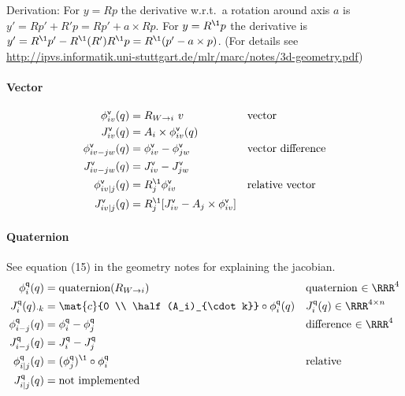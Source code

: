 \documentclass[10pt,fleqn,twoside]{article}
\newcommand{\veC}{{\textsf{v}}}
\newcommand{\quat}{{\textsf{q}}}
\newcommand{\RO}[2]{R_{{#1}\rightarrow{#2}}}
\begin{document}
{{Derivation: For $y=R p$ the derivative w.r.t.\ a rotation around axis
$a$ is $y' = R p' + R' p = R p' + a \times R p$. For $y=R^\1 p$ the
derivative is $y' = R^\1 p' - R^\1 (R') R^\1 p = R^\1 (p' - a \times
p)$.  (For details see
\url{http://ipvs.informatik.uni-stuttgart.de/mlr/marc/notes/3d-geometry.pdf})


\paragraph{Vector}

\begin{align}
\phi^\veC_{iv}(q)
 &= \RO{W}{i}~ v
 && \text{vector} \\
J^\veC_{iv}(q)
 &= A_i\times \phi^\veC_{iv}(q) \\
\phi^\veC_{iv-jw}(q)
 &= \phi^\veC_{iv} - \phi^\veC_{jw}
 && \text{vector difference} \\
J^\veC_{iv-jw}(q)
 &= J^\veC_{iv} - J^\veC_{jw} \\
\phi^\veC_{iv|j}(q)
 &= R_j^\1 \phi^\veC_{iv}
 && \text{relative vector} \\
J^\veC_{iv|j}(q)
 &= R_j^\1 [J^\veC_{iv} - A_j \times \phi^\veC_{iv}]
\end{align}


\paragraph{Quaternion}

See equation (15) in the geometry notes for explaining the jacobian.
\begin{align}
\phi^\quat_{i}(q)
 &= \text{quaternion}(\RO{W}{i})
 && \text{quaternion $\in\RRR^4$} \\
J^\quat_{i}(q)_{\cdot k}
 &= \mat{c}{0 \\ \half (A_i)_{\cdot k}} \circ \phi^\quat_{i}(q)
 && J^\quat_{i}(q)\in\RRR^{4 \times n} \\
\phi^\quat_{i-j}(q)
 &= \phi^\quat_{i} - \phi^\quat_{j}
 && \text{difference $\in\RRR^4$} \\
J^\quat_{i-j}(q)
 &= J^\quat_{i} - J^\quat_{j} \\
\phi^\quat_{i|j}(q)
 &= (\phi^\quat_{j})^\1 \circ \phi^\quat_{i}
 && \text{relative} \\
J^\quat_{i|j}(q)
 &= \text{not implemented}
\end{align}

}}
\end{document}

